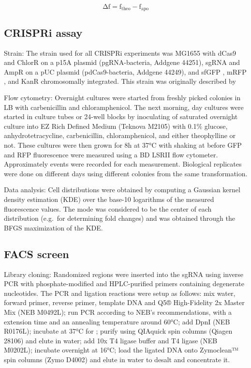 \documentclass[10pt,oneside]{article}
\begin{document}
\begin{displaymath}
 \mathrm{Δf} = \mathrm{f}_\mathrm{theo} - \mathrm{f}_\mathrm{apo}
\end{displaymath}

\subsection{CRISPRi assay}

Strain: The strain used for all CRISPRi experiments was \ecoli{} MG1655 with 
dCas9 and ChlorR on a p15A plasmid (pgRNA-bacteria, Addgene 44251), sgRNA and 
AmpR on a pUC plasmid (pdCas9-bacteria, Addgene 44249), and sfGFP 
\autocite{pedelacq2006}, mRFP \autocite{campbell2002}, and KanR chromosomally 
integrated.  This strain was originally described by 

Flow cytometry: Overnight cultures were started from freshly picked colonies in 
 LB with  carbenicillin and  chloramphenicol.  The 
next morning, day cultures were started in  culture tubes or 24-well 
blocks by inoculating  of saturated overnight culture into  EZ Rich 
Defined Medium (Teknova M2105) with 0.1\% glucose,  
an\-hydro\-tetra\-cycline,  carbenicillin,  chloramphenicol, 
and either  theophylline or not.  These cultures were then grown for 8h 
at 37°C with shaking at  before GFP and RFP fluorescence were measured 
using a BD LSRII flow cytometer.  Approximately \unit[10,000]{events} were 
recorded for each measurement.  Biological replicates were done on different 
days using different colonies from the same transformation.

Data analysis: Cell distributions were obtained by computing a Gaussian kernel 
density estimation (KDE) over the base-10 logarithms of the measured 
fluorescence values.  The mode was considered to be the center of each 
distribution (e.g.\ for determining fold changes) and was obtained through the 
BFGS maximization of the KDE.

\subsection{FACS screen}

Library cloning: Randomized regions were inserted into the sgRNA using inverse 
PCR with phosphate-modified and HPLC-purified primers containing degenerate 
nucleotides.  The PCR and ligation reactions were setup as follows: mix 
 water,   forward primer,   reverse 
primer,   template DNA and  Q5® High-Fidelity 2x 
Master Mix (NEB M0492L); run PCR according to NEB's recommendations, with a 
 extension time and an annealing temperature around 60°C; add  
 DpnI (NEB R0176L); incubate at 37°C for ; purify using QIAquick 
spin columns (Qiagen 28106) and elute in  water; add  10x T4 
ligase buffer and   T4 ligase (NEB M0202L); incubate overnight 
at 16°C; load the ligated DNA onto Zymoclean™ spin columns (Zymo D4002) and 
elute in  water to desalt and concentrate it.
\end{document}
